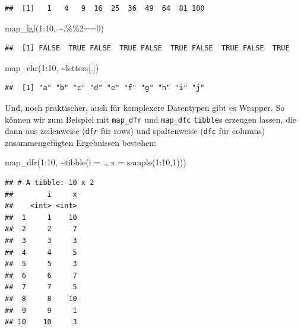 \documentclass[
]{book}
\newenvironment{Shaded}{\begin{snugshade}}{\end{snugshade}}
\newcommand{\AttributeTok}[1]{\textcolor[rgb]{0.77,0.63,0.00}{#1}}
\newcommand{\DecValTok}[1]{\textcolor[rgb]{0.00,0.00,0.81}{#1}}
\newcommand{\FunctionTok}[1]{\textcolor[rgb]{0.00,0.00,0.00}{#1}}
\newcommand{\NormalTok}[1]{#1}
\newcommand{\SpecialCharTok}[1]{\textcolor[rgb]{0.00,0.00,0.00}{#1}}
\begin{document}
\begin{verbatim}
##  [1]   1   4   9  16  25  36  49  64  81 100
\end{verbatim}

\begin{Shaded}
\begin{Highlighting}[]
\FunctionTok{map\_lgl}\NormalTok{(}\DecValTok{1}\SpecialCharTok{:}\DecValTok{10}\NormalTok{, }\SpecialCharTok{\textasciitilde{}}\NormalTok{.}\SpecialCharTok{\%\%}\DecValTok{2}\SpecialCharTok{==}\DecValTok{0}\NormalTok{)}
\end{Highlighting}
\end{Shaded}

\begin{verbatim}
##  [1] FALSE  TRUE FALSE  TRUE FALSE  TRUE FALSE  TRUE FALSE  TRUE
\end{verbatim}

\begin{Shaded}
\begin{Highlighting}[]
\FunctionTok{map\_chr}\NormalTok{(}\DecValTok{1}\SpecialCharTok{:}\DecValTok{10}\NormalTok{, }\SpecialCharTok{\textasciitilde{}}\NormalTok{letters[.])}
\end{Highlighting}
\end{Shaded}

\begin{verbatim}
##  [1] "a" "b" "c" "d" "e" "f" "g" "h" "i" "j"
\end{verbatim}

Und, noch praktischer, auch für komplexere Datentypen gibt es Wrapper. So können wir zum Beispiel mit \texttt{map\_dfr} und \texttt{map\_dfc} \texttt{tibble}s erzeugen lassen, die dann aus zeilenweise (\texttt{df}\emph{\texttt{r}} für rows) und spaltenweise (\texttt{df}\emph{\texttt{c}} für columns) zusammengefügten Ergebnissen bestehen:

\begin{Shaded}
\begin{Highlighting}[]
\FunctionTok{map\_dfr}\NormalTok{(}\DecValTok{1}\SpecialCharTok{:}\DecValTok{10}\NormalTok{, }\SpecialCharTok{\textasciitilde{}}\FunctionTok{tibble}\NormalTok{(}\AttributeTok{i =}\NormalTok{ .,}
                      \AttributeTok{x =} \FunctionTok{sample}\NormalTok{(}\DecValTok{1}\SpecialCharTok{:}\DecValTok{10}\NormalTok{,}\DecValTok{1}\NormalTok{)))}
\end{Highlighting}
\end{Shaded}

\begin{verbatim}
## # A tibble: 10 x 2
##        i     x
##    <int> <int>
##  1     1    10
##  2     2     7
##  3     3     3
##  4     4     5
##  5     5     3
##  6     6     7
##  7     7     5
##  8     8    10
##  9     9     1
## 10    10     3
\end{verbatim}
\end{document}
